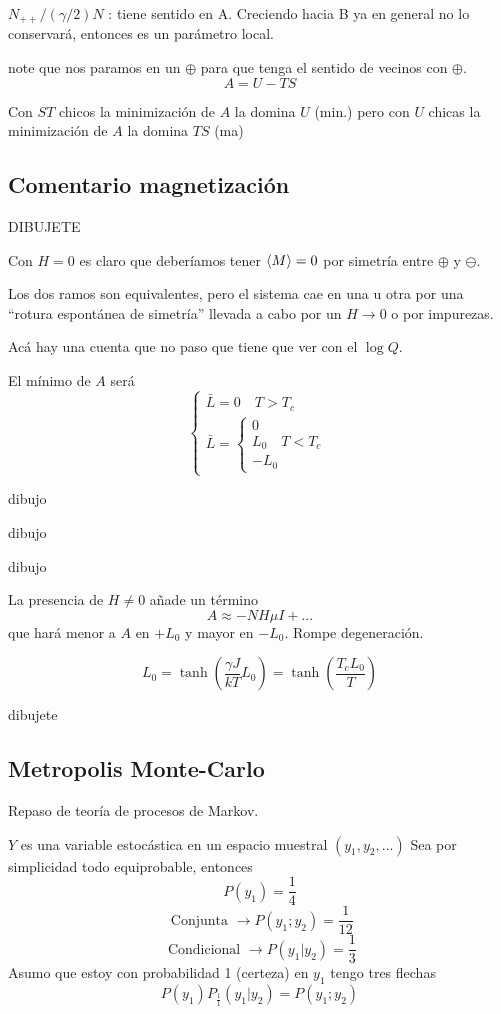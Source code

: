 \documentclass[10pt,oneside]{CBFT_book}
\begin{document}
$N_{++}/(\gamma/2)N$ : tiene sentido en A. Creciendo hacia B ya en general no lo conservará, entonces es
un parámetro local.

 note que nos paramos en un $\oplus$ para que tenga el sentido de
vecinos con $\oplus$.
\[
	A = U - TS
\]

Con $ST$ chicos la minimización de $A$ la domina $U$ (min.) pero con $U$ chicas la minimización de $A$ la domina
$TS$ (ma)

\subsection{Comentario magnetización}

DIBUJETE

Con $H=0$ es claro que deberíamos tener $ \braket{M}=0 $ por simetría entre $\oplus$ y $\ominus$.

Los dos ramos son equivalentes, pero el sistema cae en una u otra por una ``rotura espontánea de simetría''
llevada a cabo por un $ H \to 0 $ o por impurezas.

Acá hay una cuenta que no paso que tiene que ver con el $ \log Q $.

El mínimo de $A$ será 
\[ 
	\begin{cases}
		\bar{L} = 0 \quad T > T_c \\
		\bar{L} = \begin{cases}
		0 		  \\
		L_0 \quad T < T_c \\
		-L_0
		\end{cases}
	\end{cases}
\]

dibujo

dibujo

dibujo


La presencia de $ H \neq 0 $ añade un término 
\[
	A \approx - N H \mu I + ...
\]
que hará menor a $ A $ en $ + L_0 $ y mayor en $ - L_0 $. Rompe degeneración.

\[
	L_0 = \tanh\left( \frac{\gamma J}{kT}L_0\right) = \tanh\left( \frac{T_c L_0}{T}\right)
\]

dibujete

\subsection{Metropolis Monte-Carlo}

Repaso de teoría de procesos de Markov.

$Y$ es una variable estocástica en un espacio muestral $(y_1, y_2,...)$
Sea por simplicidad todo equiprobable, entonces
\[
	P(y_1) = \frac{1}{4}
\]
\[
	\text{ Conjunta } \rightarrow P(y_1;y_2) = \frac{1}{12}
\]
\[
	\text{ Condicional } \rightarrow P(y_1|y_2) = \frac{1}{3}
\]
Asumo que estoy con probabilidad 1 (certeza) en $y_1$ tengo tres flechas
\[ 
	P(y_1) P_{\frac{1}{1}}(y_1|y_2) = P(y_1;y_2)
\]
\end{document}
